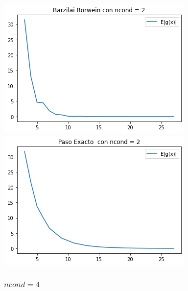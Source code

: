 \documentclass[11pt,letterpaper]{article}
\theoremstyle{definition}
\theoremstyle{definition}
\theoremstyle{definition}
\begin{document}
\begin{center}
	\includegraphics[width=0.7\linewidth]{graficas/bb_2}
	\includegraphics[width=0.7\linewidth]{graficas/sd_2}
\end{center}


\subsubsection{$ ncond = 4 $}
\end{document}
